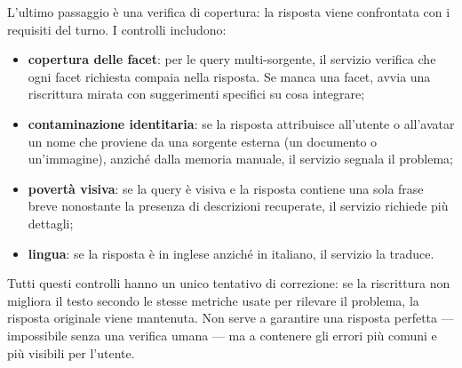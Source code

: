 L'ultimo passaggio è una verifica di copertura: la risposta viene confrontata con i requisiti del turno. I controlli includono:
\begin{itemize}
\item \textbf{copertura delle facet}: per le query multi-sorgente, il servizio verifica che ogni facet richiesta compaia nella risposta. Se manca una facet, avvia una riscrittura mirata con suggerimenti specifici su cosa integrare;
\item \textbf{contaminazione identitaria}: se la risposta attribuisce all'utente o all'avatar un nome che proviene da una sorgente esterna (un documento o un'immagine), anziché dalla memoria manuale, il servizio segnala il problema;
\item \textbf{povertà visiva}: se la query è visiva e la risposta contiene una sola frase breve nonostante la presenza di descrizioni recuperate, il servizio richiede più dettagli;
\item \textbf{lingua}: se la risposta è in inglese anziché in italiano, il servizio la traduce.
\end{itemize}

Tutti questi controlli hanno un unico tentativo di correzione: se la riscrittura non migliora il testo secondo le stesse metriche usate per rilevare il problema, la risposta originale viene mantenuta. Non serve a garantire una risposta perfetta --- impossibile senza una verifica umana --- ma a contenere gli errori più comuni e più visibili per l'utente.
